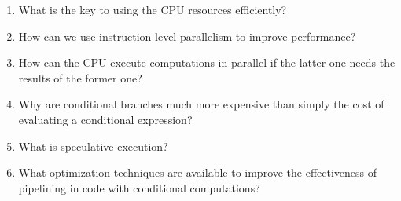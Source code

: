 \begin{enumerate}
\item What is the key to using the CPU resources efficiently?
\item How can we use instruction-level parallelism to improve performance?
\item How can the CPU execute computations in parallel if the latter one needs the results of the former one?
\item Why are conditional branches much more expensive than simply the cost of evaluating a conditional expression?
\item What is speculative execution?
\item What optimization techniques are available to improve the effectiveness of pipelining in code with conditional computations?
\end{enumerate}